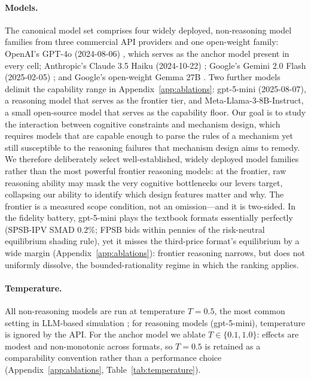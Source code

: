 \paragraph{Models.}
The canonical model set comprises four widely deployed, non-reasoning model
families from three commercial API providers and one open-weight family:
OpenAI's GPT-4o (2024-08-06) \citep{openai2024gpt4o}, which serves as the
anchor model present in every cell; Anthropic's Claude 3.5 Haiku (2024-10-22)
\citep{anthropic2024claude}; Google's Gemini 2.0 Flash (2025-02-05)
\citep{google2024gemini}; and Google's open-weight Gemma 27B
\citep{google2024gemma}. Two further models delimit the capability range in
Appendix~\ref{app:ablations}: gpt-5-mini (2025-08-07), a reasoning model that
serves as the frontier tier, and Meta-Llama-3-8B-Instruct, a small
open-source model that serves as the capability floor. Our goal is to study the
interaction between cognitive constraints and mechanism design, which requires
models that are capable enough to parse the rules of a mechanism yet still
susceptible to the reasoning failures that mechanism design aims to remedy. We
therefore deliberately select well-established, widely deployed model families
rather than the most powerful frontier reasoning models: at the frontier, raw
reasoning ability may mask the very cognitive bottlenecks our levers target,
collapsing our ability to identify which design features matter and why. The
frontier is a measured scope condition, not an omission---and it is
two-sided. In the fidelity battery, gpt-5-mini plays the textbook formats
essentially perfectly (SPSB-IPV SMAD $0.2\%$; FPSB bids within pennies of the
risk-neutral equilibrium shading rule), yet it misses the third-price
format's equilibrium by a wide margin (Appendix~\ref{app:ablations}): frontier
reasoning narrows, but does not uniformly dissolve, the bounded-rationality
regime in which the ranking applies.

\paragraph{Temperature.}
All non-reasoning models are run at temperature $T=0.5$, the most common
setting in LLM-based simulation \citep{horton2023large,Horton2024EDSL}; for
reasoning models (gpt-5-mini), temperature is ignored by the API. For the
anchor model we ablate $T\in\{0.1, 1.0\}$: effects are modest and
non-monotonic across formats, so $T=0.5$ is retained as a comparability
convention rather than a performance choice
(Appendix~\ref{app:ablations}, Table~\ref{tab:temperature}).

